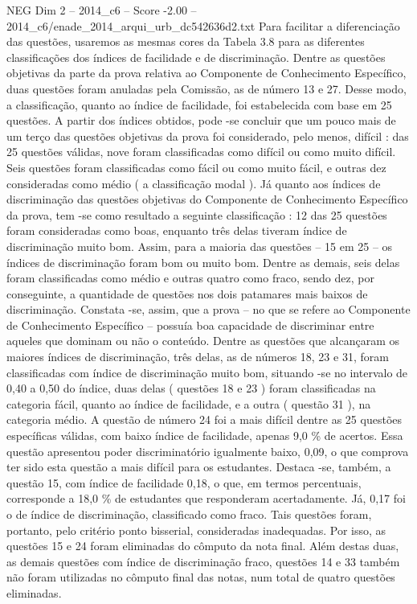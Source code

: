\begin{textsample}{NEG Dim 2 – 2014\_c6 – Score -2.00 – 2014\_c6/enade\_2014\_arqui\_urb\_dc542636d2.txt}
Para facilitar a diferenciação das questões, usaremos as mesmas cores da Tabela 3.8 para as diferentes classificações dos índices de facilidade e de discriminação.
Dentre as questões objetivas da parte da prova relativa ao Componente de Conhecimento Específico, duas questões foram anuladas pela Comissão, as de número 13 e 27.
Desse modo, a classificação, quanto ao índice de facilidade, foi estabelecida com base em 25 questões.
A partir dos índices obtidos, pode -se concluir que um pouco mais de um terço das questões objetivas da prova foi considerado, pelo menos, difícil : das 25 questões válidas, nove foram classificadas como difícil ou como muito difícil.
Seis questões foram classificadas como fácil ou como muito fácil, e outras dez consideradas como médio ( a classificação modal ).
Já quanto aos índices de discriminação das questões objetivas do Componente de Conhecimento Específico da prova, tem -se como resultado a seguinte classificação : 12 das 25 questões foram consideradas como boas, enquanto três delas tiveram índice de discriminação muito bom.
Assim, para a maioria das questões – 15 em 25 – os índices de discriminação foram bom ou muito bom.
Dentre as demais, seis delas foram classificadas como médio e outras quatro como fraco, sendo dez, por conseguinte, a quantidade de questões nos dois patamares mais baixos de discriminação.
Constata -se, assim, que a prova – no que se refere ao Componente de Conhecimento Específico – possuía boa capacidade de discriminar entre aqueles que dominam ou não o conteúdo.
Dentre as questões que alcançaram os maiores índices de discriminação, três delas, as de números 18, 23 e 31, foram classificadas com índice de discriminação muito bom, situando -se no intervalo de 0,40 a 0,50 do índice, duas delas ( questões 18 e 23 ) foram classificadas na categoria fácil, quanto ao índice de facilidade, e a outra ( questão 31 ), na categoria médio.
A questão de número 24 foi a mais difícil dentre as 25 questões específicas válidas, com baixo índice de facilidade, apenas 9,0 \% de acertos.
Essa questão apresentou poder discriminatório igualmente baixo, 0,09, o que comprova ter sido esta questão a mais difícil para os estudantes.
Destaca -se, também, a questão 15, com índice de facilidade 0,18, o que, em termos percentuais, corresponde a 18,0 \% de estudantes que responderam acertadamente.
Já, 0,17 foi o de índice de discriminação, classificado como fraco.
Tais questões foram, portanto, pelo critério ponto bisserial, consideradas inadequadas.
Por isso, as questões 15 e 24 foram eliminadas do cômputo da nota final.
Além destas duas, as demais questões com índice de discriminação fraco, questões 14 e 33 também não foram utilizadas no cômputo final das notas, num total de quatro questões eliminadas.

\end{textsample}
